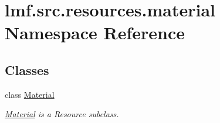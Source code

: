 \hypertarget{namespacelmf_1_1src_1_1resources_1_1material}{\section{lmf.\+src.\+resources.\+material Namespace Reference}
\label{namespacelmf_1_1src_1_1resources_1_1material}
}
\subsection*{Classes}
\begin{DoxyCompactItemize}
\item 
class \hyperlink{classlmf_1_1src_1_1resources_1_1material_1_1_material}{Material}
\begin{DoxyCompactList}\small\item\em \hyperlink{classlmf_1_1src_1_1resources_1_1material_1_1_material}{Material} is a Resource subclass. \end{DoxyCompactList}\end{DoxyCompactItemize}

